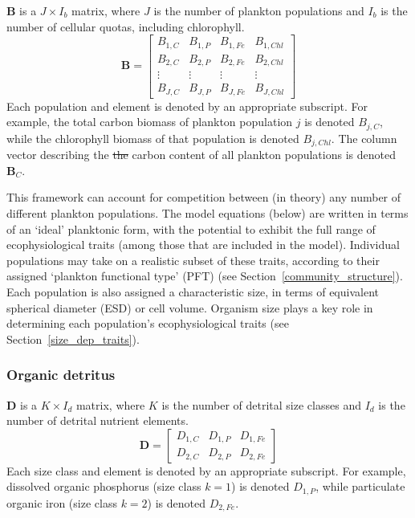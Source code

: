 \documentclass[gmd, manuscript]{copernicus}
\newcommand{\matr}[1]{\mathbf{#1}}
\providecommand{\DIFdel}[1]{{\protect\color{red}\sout{#1}}}                      %
\providecommand{\DIFdelbegin}{} %
\providecommand{\DIFdelend}{} %
\begin{document}
$\matr{B}$ is a $J\times I_b$ matrix, where $J$ is the number of plankton populations and $I_b$ is the number of cellular quotas, including chlorophyll.
%
\begin{equation}
\matr{B}=\left[\begin{array}{cccccc} B_{1,C}		& B_{1,P}		& B_{1,Fe}	& B_{1,Chl} 	\\
 	B_{2,C}		& B_{2,P}		& B_{2,Fe}	& B_{2,Chl} 	\\
 	\vdots		& \vdots		& \vdots 		& \vdots 		\\
 	B_{J,C}		& B_{J,P}		& B_{J,Fe}	& B_{J,Chl} 	\end{array}\right]
\end{equation}
%
Each population and element is denoted by an appropriate subscript. For example, the total carbon biomass of plankton population $j$ is denoted $B_{j,C}$, while the chlorophyll biomass of that population is denoted $B_{j,Chl}$. The column vector describing the \DIFdelbegin \DIFdel{the }\DIFdelend carbon content of all plankton populations is denoted $\matr{B}_{C}$.

This framework can account for competition between (in theory) any number of different plankton populations. The model equations (below) are written in terms of an `ideal' planktonic form, with the potential to exhibit the full range of ecophysiological traits (among those that are included in the model). Individual populations may take on a realistic subset of these traits, according to their assigned `plankton functional type' (PFT) (see Section~\ref{community_structure}). Each population is also assigned a characteristic size, in terms of equivalent spherical diameter (ESD) or cell volume. Organism size plays a key role in determining each population's ecophysiological traits (see Section~\ref{size_dep_traits}).

\subsubsection{Organic detritus}

$\matr{D}$ is a $K\times I_d$ matrix, where $K$ is the number of detrital size classes and $I_d$ is the number of detrital nutrient elements.
%
\begin{equation}
\matr{D}=\left[\begin{array}{ccc}	D_{1,C}	& D_{1,P}	& D_{1,Fe} \\
 	D_{2,C} 	& D_{2,P} 	& D_{2,Fe} \end{array}\right]
\end{equation}
%
Each size class and element is denoted by an appropriate subscript. For example, dissolved organic phosphorus (size class $k=1$) is denoted $D_{1,P}$, while particulate organic iron (size class $k=2$) is denoted $D_{2,Fe}$.
\end{document}
